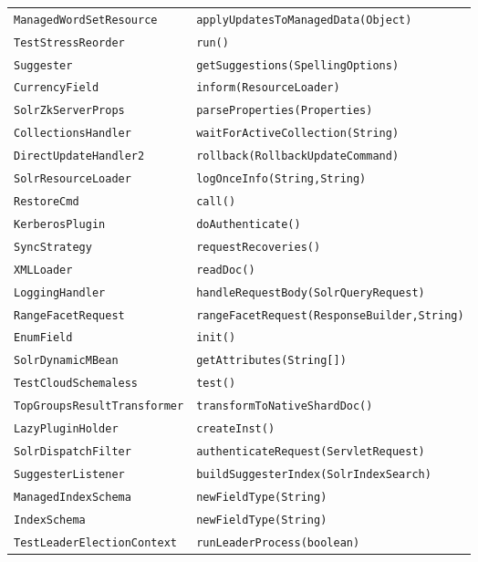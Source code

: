\begin{center}
\begin{longtable}{ll}
 \lstinline/ManagedWordSetResource/&{\lstinline/applyUpdatesToManagedData(Object)/}\\
 \lstinline/TestStressReorder/&{\lstinline/run()/}\\
 \lstinline/Suggester/&{\lstinline/getSuggestions(SpellingOptions)/}\\
 \lstinline/CurrencyField/&{\lstinline/inform(ResourceLoader)/}\\
 \lstinline/SolrZkServerProps/&{\lstinline/parseProperties(Properties)/}\\
 \lstinline/CollectionsHandler/&{\lstinline/waitForActiveCollection(String)/}\\
 \lstinline/DirectUpdateHandler2/&{\lstinline/rollback(RollbackUpdateCommand)/}\\
 \lstinline/SolrResourceLoader/&{\lstinline/logOnceInfo(String,String)/}\\
 \lstinline/RestoreCmd/&{\lstinline/call()/}\\
 \lstinline/KerberosPlugin/&{\lstinline/doAuthenticate()/}\\
 \lstinline/SyncStrategy/&{\lstinline/requestRecoveries()/}\\
 \lstinline/XMLLoader/&{\lstinline/readDoc()/}\\
 \lstinline/LoggingHandler/&{\lstinline/handleRequestBody(SolrQueryRequest)/}\\
 \lstinline/RangeFacetRequest/&{\lstinline/rangeFacetRequest(ResponseBuilder,String)/}\\
 \lstinline/EnumField/&{\lstinline/init()/}\\
 \lstinline/SolrDynamicMBean/&{\lstinline/getAttributes(String[])/}\\
 \lstinline/TestCloudSchemaless/&{\lstinline/test()/}\\
 \lstinline/TopGroupsResultTransformer/&{\lstinline/transformToNativeShardDoc()/}\\
 \lstinline/LazyPluginHolder/&{\lstinline/createInst()/}\\
 \lstinline/SolrDispatchFilter/&{\lstinline/authenticateRequest(ServletRequest)/}\\
 \lstinline/SuggesterListener/&{\lstinline/buildSuggesterIndex(SolrIndexSearch)/}\\
 \lstinline/ManagedIndexSchema/&{\lstinline/newFieldType(String)/}\\
 \lstinline/IndexSchema/&{\lstinline/newFieldType(String)/}\\
 \lstinline/TestLeaderElectionContext/&{\lstinline/runLeaderProcess(boolean)/}\\

\end{longtable}
\end{center}
